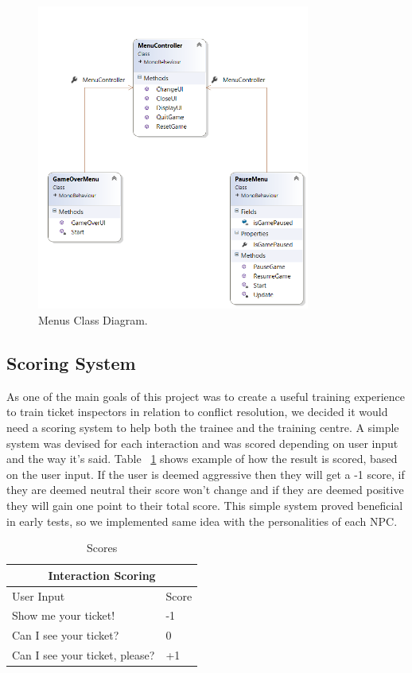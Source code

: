 \begin{figure}[h!]
	\caption{Menus Class Diagram.}
	\label{image:Menus}
	\centering
	\includegraphics[width=0.8\textwidth]{Images/ClassDiagram Menus.png}
\end{figure}

\subsection{Scoring System}
As one of the main goals of this project was to create a useful training experience to train ticket inspectors in relation to conflict resolution, we decided it would need a scoring system to help both the trainee and the training centre. A simple system was devised for each interaction and was scored depending on user input and the way it's said. Table ~\ref{tab:scores} shows example of how the result is scored, based on the user input. If the user is deemed aggressive then they will get a -1 score, if they are deemed neutral their score won't change and if they are deemed positive they will gain one point to their total score. This simple system proved beneficial in early tests, so we implemented same idea with the personalities of each NPC.

\begin{table}[!ht]
    \centering
\begin{tabular}{ |p{6cm}|p{2cm}|  }
\hline
\multicolumn{2}{|c|}{Interaction Scoring} \\
\hline
User Input & Score \\
\hline
Show me your ticket! & -1 \\
\hline
Can I see your ticket? & 0 \\
\hline
Can I see your ticket, please? & +1 \\
\hline

\end{tabular}
    \caption{Scores}
    \label{tab:scores}
\end{table}


